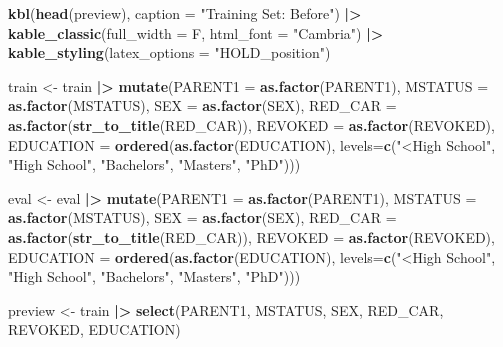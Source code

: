 \documentclass[
]{article}
\newenvironment{Shaded}{\begin{snugshade}}{\end{snugshade}}
\newcommand{\AttributeTok}[1]{\textcolor[rgb]{0.13,0.29,0.53}{#1}}
\newcommand{\FunctionTok}[1]{\textcolor[rgb]{0.13,0.29,0.53}{\textbf{#1}}}
\newcommand{\NormalTok}[1]{#1}
\newcommand{\OtherTok}[1]{\textcolor[rgb]{0.56,0.35,0.01}{#1}}
\newcommand{\SpecialCharTok}[1]{\textcolor[rgb]{0.81,0.36,0.00}{\textbf{#1}}}
\newcommand{\StringTok}[1]{\textcolor[rgb]{0.31,0.60,0.02}{#1}}
\begin{document}
\begin{Shaded}
\begin{Highlighting}[]
\FunctionTok{kbl}\NormalTok{(}\FunctionTok{head}\NormalTok{(preview), }\AttributeTok{caption =} \StringTok{"Training Set: Before"}\NormalTok{) }\SpecialCharTok{|\textgreater{}}
  \FunctionTok{kable\_classic}\NormalTok{(}\AttributeTok{full\_width =}\NormalTok{ F, }\AttributeTok{html\_font =} \StringTok{"Cambria"}\NormalTok{) }\SpecialCharTok{|\textgreater{}}
  \FunctionTok{kable\_styling}\NormalTok{(}\AttributeTok{latex\_options =} \StringTok{"HOLD\_position"}\NormalTok{)}

\NormalTok{train }\OtherTok{\textless{}{-}}
\NormalTok{  train }\SpecialCharTok{|\textgreater{}}
  \FunctionTok{mutate}\NormalTok{(}\AttributeTok{PARENT1 =} \FunctionTok{as.factor}\NormalTok{(PARENT1), }
         \AttributeTok{MSTATUS =} \FunctionTok{as.factor}\NormalTok{(MSTATUS), }
         \AttributeTok{SEX =} \FunctionTok{as.factor}\NormalTok{(SEX), }
         \AttributeTok{RED\_CAR =} \FunctionTok{as.factor}\NormalTok{(}\FunctionTok{str\_to\_title}\NormalTok{(RED\_CAR)), }
         \AttributeTok{REVOKED =} \FunctionTok{as.factor}\NormalTok{(REVOKED), }
         \AttributeTok{EDUCATION =} \FunctionTok{ordered}\NormalTok{(}\FunctionTok{as.factor}\NormalTok{(EDUCATION), }\AttributeTok{levels=}\FunctionTok{c}\NormalTok{(}\StringTok{"\textless{}High School"}\NormalTok{, }\StringTok{"High School"}\NormalTok{, }\StringTok{"Bachelors"}\NormalTok{, }\StringTok{"Masters"}\NormalTok{, }\StringTok{"PhD"}\NormalTok{)))}

\NormalTok{eval }\OtherTok{\textless{}{-}}
\NormalTok{  eval }\SpecialCharTok{|\textgreater{}}
  \FunctionTok{mutate}\NormalTok{(}\AttributeTok{PARENT1 =} \FunctionTok{as.factor}\NormalTok{(PARENT1), }
         \AttributeTok{MSTATUS =} \FunctionTok{as.factor}\NormalTok{(MSTATUS), }
         \AttributeTok{SEX =} \FunctionTok{as.factor}\NormalTok{(SEX), }
         \AttributeTok{RED\_CAR =} \FunctionTok{as.factor}\NormalTok{(}\FunctionTok{str\_to\_title}\NormalTok{(RED\_CAR)), }
         \AttributeTok{REVOKED =} \FunctionTok{as.factor}\NormalTok{(REVOKED), }
         \AttributeTok{EDUCATION =} \FunctionTok{ordered}\NormalTok{(}\FunctionTok{as.factor}\NormalTok{(EDUCATION), }\AttributeTok{levels=}\FunctionTok{c}\NormalTok{(}\StringTok{"\textless{}High School"}\NormalTok{, }\StringTok{"High School"}\NormalTok{, }\StringTok{"Bachelors"}\NormalTok{, }\StringTok{"Masters"}\NormalTok{, }\StringTok{"PhD"}\NormalTok{)))}

\NormalTok{preview }\OtherTok{\textless{}{-}}
\NormalTok{  train }\SpecialCharTok{|\textgreater{}}
  \FunctionTok{select}\NormalTok{(PARENT1, MSTATUS, SEX, RED\_CAR, REVOKED, EDUCATION)}


\end{Highlighting}
\end{Shaded}
\end{document}

